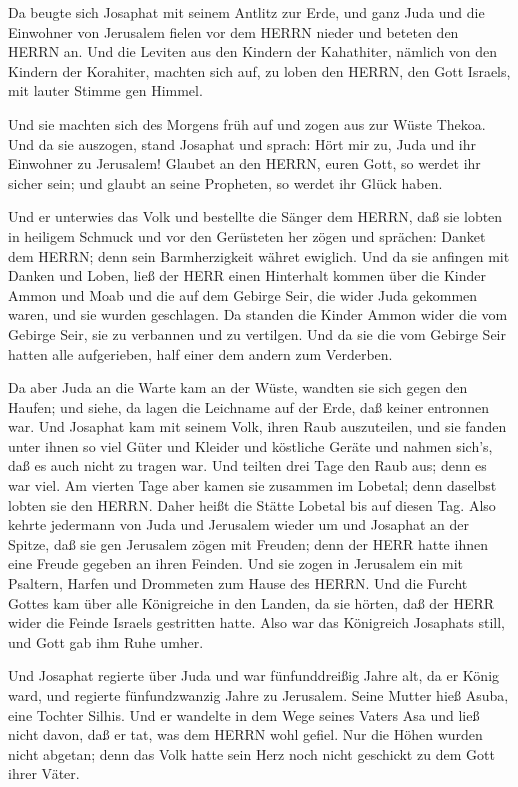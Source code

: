  Da beugte sich Josaphat mit seinem Antlitz zur Erde, und
ganz Juda und die Einwohner von Jerusalem fielen vor dem HERRN nieder
und beteten den HERRN an.  Und die Leviten aus den Kindern
der Kahathiter, nämlich von den Kindern der Korahiter, machten sich auf,
zu loben den HERRN, den Gott Israels, mit lauter Stimme gen Himmel.

 Und sie machten sich des Morgens früh auf und zogen aus
zur Wüste Thekoa. Und da sie auszogen, stand Josaphat und sprach: Hört
mir zu, Juda und ihr Einwohner zu Jerusalem! Glaubet an den HERRN, euren
Gott, so werdet ihr sicher sein; und glaubt an seine Propheten, so
werdet ihr Glück haben.

 Und er unterwies das Volk und bestellte die Sänger dem
HERRN, daß sie lobten in heiligem Schmuck und vor den Gerüsteten her
zögen und sprächen: Danket dem HERRN; denn sein Barmherzigkeit währet
ewiglich.  Und da sie anfingen mit Danken und Loben, ließ
der HERR einen Hinterhalt kommen über die Kinder Ammon und Moab und die
auf dem Gebirge Seir, die wider Juda gekommen waren, und sie wurden
geschlagen.  Da standen die Kinder Ammon wider die vom
Gebirge Seir, sie zu verbannen und zu vertilgen. Und da sie die vom
Gebirge Seir hatten alle aufgerieben, half einer dem andern zum
Verderben.

 Da aber Juda an die Warte kam an der Wüste, wandten sie
sich gegen den Haufen; und siehe, da lagen die Leichname auf der Erde,
daß keiner entronnen war.  Und Josaphat kam mit seinem
Volk, ihren Raub auszuteilen, und sie fanden unter ihnen so viel Güter
und Kleider und köstliche Geräte und nahmen sich's, daß es auch nicht zu
tragen war. Und teilten drei Tage den Raub aus; denn es war viel.
 Am vierten Tage aber kamen sie zusammen im Lobetal; denn
daselbst lobten sie den HERRN. Daher heißt die Stätte Lobetal bis auf
diesen Tag.  Also kehrte jedermann von Juda und Jerusalem
wieder um und Josaphat an der Spitze, daß sie gen Jerusalem zögen mit
Freuden; denn der HERR hatte ihnen eine Freude gegeben an ihren Feinden.
 Und sie zogen in Jerusalem ein mit Psaltern, Harfen und
Drommeten zum Hause des HERRN.  Und die Furcht Gottes kam
über alle Königreiche in den Landen, da sie hörten, daß der HERR wider
die Feinde Israels gestritten hatte.  Also war das
Königreich Josaphats still, und Gott gab ihm Ruhe umher.

 Und Josaphat regierte über Juda und war fünfunddreißig
Jahre alt, da er König ward, und regierte fünfundzwanzig Jahre zu
Jerusalem. Seine Mutter hieß Asuba, eine Tochter Silhis. 
Und er wandelte in dem Wege seines Vaters Asa und ließ nicht davon, daß
er tat, was dem HERRN wohl gefiel.  Nur die Höhen wurden
nicht abgetan; denn das Volk hatte sein Herz noch nicht geschickt zu dem
Gott ihrer Väter.

